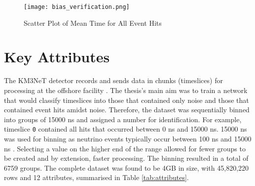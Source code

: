 \begin{figure}[ht!]
    \centering
    \texttt{[image: bias\_verification.png]}
    \caption{Scatter Plot of Mean Time for All Event Hits}
    \label{fig:bias_verification}
\end{figure}



\section{Key Attributes}
The KM3NeT detector records and sends data in chunks (timeslices) for processing at the offshore facility \cite{km3net_2017}. The thesis's main aim was to train a network that would classify timeslices into those that contained only noise and those that contained event hits amidst noise. Therefore, the dataset was sequentially binned into groups of 15000 ns and assigned a number for identification. For example, timeslice \texttt{0} contained all hits that occurred between 0 ns and 15000 ns. 15000 ns was used for binning as neutrino events typically occur between 100 ns and 15000 ns \cite{km3net_2017}. Selecting a value on the higher end of the range allowed for fewer groups to be created and by extension, faster processing. The binning resulted in a total of 6759 groups. The complete dataset was found to be 4GB in size, with 45,820,220 rows and 12 attributes, summarised in Table \ref{tab:attributes}.

